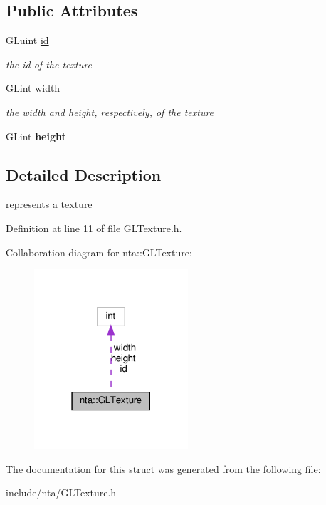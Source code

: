 \subsection*{Public Attributes}
\begin{DoxyCompactItemize}
\item 
\mbox{\label{structnta_1_1GLTexture_aaf0d536088f4b1062d996679b217c0f9}} 
G\+Luint \hyperlink{structnta_1_1GLTexture_aaf0d536088f4b1062d996679b217c0f9}{id}
\begin{DoxyCompactList}\small\item\em the id of the texture \end{DoxyCompactList}\item 
\mbox{\label{structnta_1_1GLTexture_a8f4d13ab2b19b700f76334c46458ac48}} 
G\+Lint \hyperlink{structnta_1_1GLTexture_a8f4d13ab2b19b700f76334c46458ac48}{width}
\begin{DoxyCompactList}\small\item\em the width and height, respectively, of the texture \end{DoxyCompactList}\item 
\mbox{\label{structnta_1_1GLTexture_a4ac2e45733ffb16238eb696d663e62a1}} 
G\+Lint {\bfseries height}
\end{DoxyCompactItemize}


\subsection{Detailed Description}
represents a texture 

Definition at line 11 of file G\+L\+Texture.\+h.



Collaboration diagram for nta\+:\+:G\+L\+Texture\+:\nopagebreak
\begin{figure}[H]
\begin{center}
\leavevmode
\includegraphics[width=162pt]{d3/d3e/structnta_1_1GLTexture__coll__graph}
\end{center}
\end{figure}


The documentation for this struct was generated from the following file\+:\begin{DoxyCompactItemize}
\item 
include/nta/G\+L\+Texture.\+h\end{DoxyCompactItemize}
